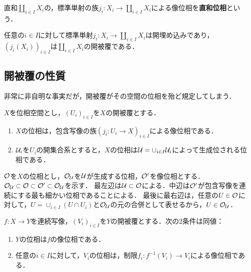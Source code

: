 \documentclass[uplatex,dvipdfmx]{jsreport}
\begin{document}
\begin{definition}
    直和$\coprod_{i\in I}X_i$の，標準単射の族$j_i:X_i\to\coprod_{i\in I}X_i$による像位相を\textbf{直和位相}という．
\end{definition}

\begin{lemma}
    任意の$i\in I$に対して標準単射$j_i:X_i\to\coprod_{i\in I}X_i$は開埋め込みであり，$(j_i(X_i))_{i\in I}$は$\coprod_{i\in I}X_i$の開被覆である．
\end{lemma}

\subsection{開被覆の性質}

\begin{tcolorbox}[colframe=ForestGreen, colback=ForestGreen!10!white,breakable,colbacktitle=ForestGreen!40!white,coltitle=black,fonttitle=\bfseries\sffamily,
title=]
    非常に非自明な事実だが，開被覆がその空間の位相を殆ど規定してしまう．
\end{tcolorbox}

\begin{proposition}[開被覆の像位相としての見方]
    $X$を位相空間とし，$(U_i)_{i\in I}$を$X$の開被覆とする．
    \begin{enumerate}
        \item $X$の位相は，包含写像の族$(j_i:U_i\to X)_{i\in I}$による像位相である．
        \item $\mathcal{U}_i$を$U_i$の開集合系とすると，$X$の位相は$\mathcal{U}=\cup_{i\in I}\mathcal{U}_i$によって生成位される位相である．
    \end{enumerate}
\end{proposition}
\begin{Proof}
    $\mathcal{O}$を$X$の位相とし，$\mathcal{O}_{\mathcal{U}}$を$\mathcal{U}$が生成する位相，$\mathcal{O}'$を像位相とする．
    $\mathcal{O}_{\mathcal{U}}\subset\mathcal{O}\subset\mathcal{O}'\subset\mathcal{O}_{\mathcal{U}}$を示す．
    最左辺は$\mathcal{U}\subset\mathcal{O}$による．中辺は$\mathcal{O}'$が包含写像を連続にする最も細かい位相であることによる．
    最後に最右辺は，任意の$U\in\mathcal{O}$に対して，$U=\cup_{i\in I}(U\cap U_i)$と$\mathcal{O}_{\mathcal{U}}$の元の合併として表せるから，$U\in\mathcal{O}_{\mathcal{U}}$．
\end{Proof}


\begin{proposition}
    $f:X\to Y$を連続写像，$(V_i)_{i\in I}$を$Y$の開被覆とする．次の2条件は同値：
    \begin{enumerate}
        \item $Y$の位相は$f$の像位相である．
        \item 任意の$i\in I$に対して，$V_i$の位相は，制限$f_i:f^{-1}(V_i)\to V_i$による像位相である．
    \end{enumerate}
\end{proposition}
\end{document}

